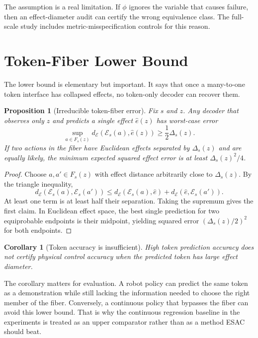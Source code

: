 \documentclass{article}
\newtheorem{proposition}{Proposition}
\newtheorem{corollary}{Corollary}
\newcommand{\E}{\mathcal{E}}
\begin{document}
The assumption is a real limitation. If $\phi$ ignores the variable that causes
failure, then an effect-diameter audit can certify the wrong equivalence class.
The full-scale study includes metric-misspecification controls for this reason.

\section{Token-Fiber Lower Bound}

The lower bound is elementary but important. It says that once a many-to-one
token interface has collapsed effects, no token-only decoder can recover them.

\begin{proposition}[Irreducible token-fiber error]
Fix $s$ and $z$. Any decoder that observes only $z$ and predicts a single
effect $\hat e(z)$ has worst-case error
\[
    \sup_{a\in F_s(z)} d_\E(\E_s(a),\hat e(z))
    \geq \frac{1}{2}\Delta_s(z).
\]
If two actions in the fiber have Euclidean effects separated by $\Delta_s(z)$
and are equally likely, the minimum expected squared effect error is at least
$\Delta_s(z)^2/4$.
\end{proposition}

\begin{proof}
Choose $a,a'\in F_s(z)$ with effect distance arbitrarily close to
$\Delta_s(z)$. By the triangle inequality,
\[
    d_\E(\E_s(a),\E_s(a'))
    \leq d_\E(\E_s(a),\hat e)+d_\E(\hat e,\E_s(a')).
\]
At least one term is at least half their separation. Taking the supremum gives
the first claim. In Euclidean effect space, the best single prediction for two
equiprobable endpoints is their midpoint, yielding squared error
$(\Delta_s(z)/2)^2$ for both endpoints.
\end{proof}

\begin{corollary}[Token accuracy is insufficient]
High token prediction accuracy does not certify physical control accuracy when
the predicted token has large effect diameter.
\end{corollary}

The corollary matters for evaluation. A robot policy can predict the same token
as a demonstration while still lacking the information needed to choose the
right member of the fiber. Conversely, a continuous policy that bypasses the
fiber can avoid this lower bound. That is why the continuous regression baseline
in the experiments is treated as an upper comparator rather than as a method
ESAC should beat.
\end{document}
